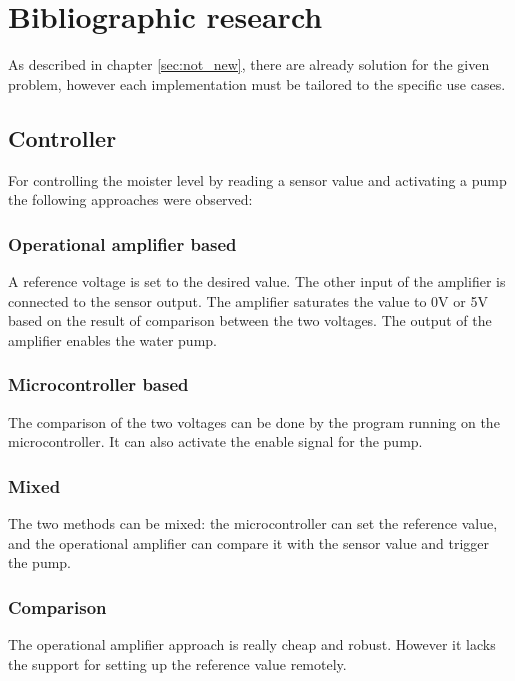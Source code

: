 \chapter{Bibliographic research} 

As described in chapter \ref{sec:not_new}, there are already solution for the given problem, however each implementation must be tailored to the specific use cases.




\section{Controller}

For controlling the moister level by reading a sensor value and activating  a pump the following approaches were observed:

\subsection{Operational amplifier based} 

A reference voltage is set to the desired value. The other input of the amplifier is connected to the sensor output. The amplifier saturates the value to 0V or 5V based on the result of comparison between the two voltages. The output of the amplifier enables the water pump.

\subsection{Microcontroller based}

The comparison of the two voltages can be done by the program running on the microcontroller. It can also activate the enable signal for the pump. 

\subsection{Mixed}

The two methods can be mixed: the microcontroller can set the reference value, and the operational amplifier can compare it with the sensor value and trigger the pump.


\subsection{Comparison}

The operational amplifier approach is really cheap and robust. However it lacks the support for setting up the reference value remotely. 

